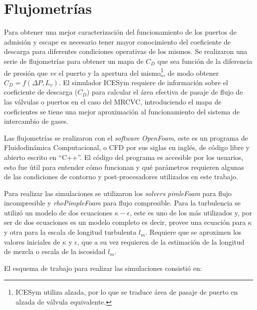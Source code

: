 \chapter{Flujometrías}
%
%
Para obtener una mejor caracterización del funcionamiento de los puertos de
admisión y escape es necesario tener mayor conocimiento del coeficiente de
descarga para diferentes condiciones operativas de los mismos.
%
Se realizaron una serie de flujometrías para obtener un mapa de $C_{D}$ que sea
función de la diferencia de presión que \emph{ve} el puerto y la apertura del
mismo\footnote{ICESym utiliza alzada, por lo que se traduce área de pasaje de
puerto en alzada de válvula equivalente.}, de modo obtener
$C_{D} = f(\Delta P,L_v)$.
%
El simulador ICESym requiere de información sobre el coeficiente de descarga
($C_{D}$) para calcular el área efectiva de pasaje de flujo de las válvulas o
puertos en el caso del MRCVC, introduciendo el mapa de coeficientes se tiene una
mejor aproximación al funcionamiento del sistema de intercambio de gases.

Las flujometrías se realizaron con el \emph{software} \emph{OpenFoam}, este es
un programa de Fluidodinámica Computacional, o CFD por sus siglas en inglés, de
código libre y abierto escrito en ``C++''.
%
El código del programa es accesible por los usuarios, esto fue útil para
entender cómo funcionan y qué parámetros requieren algunas de las condiciones de
contorno y post-procesadores utilizados en este trabajo.

Para realizar las simulaciones se utilizaron los \emph{solvers} \emph{pimleFoam}
para flujo incompresible y \emph{rhoPimpleFoam} para flujo compresible.
%
Para la turbulencia se utilizó un modelo de dos ecuaciones
\emph{$\kappa-\epsilon$}\cite{wilcox}, este es uno de los más utilizados y, por
ser de dos ecuaciones es un modelo completo es decir, provee una ecuación para
$\kappa$ y otra para la escala de longitud turbulenta $l_m$.
%
Requiere que se aproximen los valores iniciales de $\kappa$ y $\epsilon$, que a
su vez requieren de la estimación de la longitud de mezcla o escala de la
iscosidad $l_m$.


El esquema de trabajo para realizar las simulaciones consistió en:

